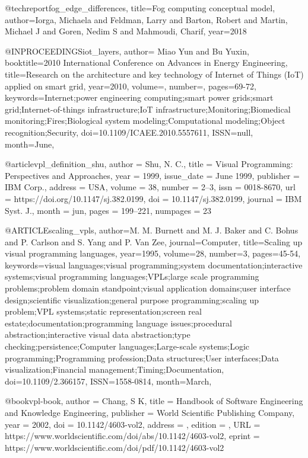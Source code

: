 @techreport{fog_edge_differences,
  title={Fog computing conceptual model},
  author={Iorga, Michaela and Feldman, Larry and Barton, Robert and Martin, Michael J and Goren, Nedim S and Mahmoudi, Charif},
  year={2018}
}

@INPROCEEDINGS{iot_layers,
    author={ {Miao Yun} and {Bu Yuxin}},
    booktitle={2010 International Conference on Advances in Energy Engineering},
    title={Research on the architecture and key technology of Internet of Things (IoT) applied on smart grid},
    year={2010},
    volume={},
    number={},
    pages={69-72},
    keywords={Internet;power engineering computing;smart power grids;smart grid;Internet-of-things infrastructure;IoT infrastructure;Monitoring;Biomedical monitoring;Fires;Biological system modeling;Computational modeling;Object recognition;Security},
    doi={10.1109/ICAEE.2010.5557611},
    ISSN={null},
    month={June},
}


@article{vpl_definition_shu,
    author = {Shu, N. C.},
    title = {Visual Programming: Perspectives and Approaches},
    year = {1999},
    issue_date = {June 1999},
    publisher = {IBM Corp.},
    address = {USA},
    volume = {38},
    number = {2–3},
    issn = {0018-8670},
    url = {https://doi.org/10.1147/sj.382.0199},
    doi = {10.1147/sj.382.0199},
    journal = {IBM Syst. J.},
    month = jun,
    pages = {199–221},
    numpages = {23}
}

@ARTICLE{scaling_vpls,
    author={M. M. {Burnett} and M. J. {Baker} and C. {Bohus} and P. {Carlson} and S. {Yang} and P. {Van Zee}},
    journal={Computer},
    title={Scaling up visual programming languages},
    year={1995},
    volume={28},
    number={3},
    pages={45-54},
    keywords={visual languages;visual programming;system documentation;interactive systems;visual programming languages;VPLs;large scale programming problems;problem domain standpoint;visual application domains;user interface design;scientific visualization;general purpose programming;scaling up problem;VPL systems;static representation;screen real estate;documentation;programming language issues;procedural abstraction;interactive visual data abstraction;type checking;persistence;Computer languages;Large-scale systems;Logic programming;Programming profession;Data structures;User interfaces;Data visualization;Financial management;Timing;Documentation},
    doi={10.1109/2.366157},
    ISSN={1558-0814},
    month={March},
}

@book{vpl-book,
    author = {Chang, S K},
    title = {Handbook of Software Engineering and Knowledge Engineering},
    publisher = {World Scientific Publishing Company},
    year = {2002},
    doi = {10.1142/4603-vol2},
    address = {},
    edition   = {},
    URL = {https://www.worldscientific.com/doi/abs/10.1142/4603-vol2},
    eprint = {https://www.worldscientific.com/doi/pdf/10.1142/4603-vol2}
}

